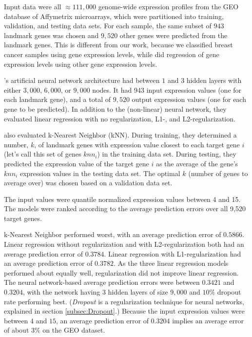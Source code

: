 Input data were all $\approx111,000$ genome-wide expression profiles
from the GEO database of Affymetrix microarrays, which were partitioned
into training, validation, and testing data sets. For each sample,
the same subset of $943$ landmark genes was chosen and $9,520$ other
genes were predicted from the landmark genes. This is different from
our work, because we classified breast cancer samples using gene expression
levels, while \cite{ChenXie2015} did regression of gene expression
levels using other gene expression levels.

\cite{ChenXie2015}'s artificial neural network architecture had between
$1$ and $3$ hidden layers with either $3,000$, $6,000$, or $9,000$
nodes. It had 943 input expression values (one for each landmark gene),
and a total of $9,520$ output expression values (one for each gene
to be predicted). In addition to the (non-linear) neural network,
they evaluated linear regression with no regularization, L1-, and
L2-regularization.

\cite{ChenXie2015} also evaluated k-Nearest Neighbor (kNN).
During training, they determined a number, $k$, of landmark genes
with expression value closest to each target gene $i$ (let's call
this set of genes $knn_{i}$) in the training data set. During testing,
they predicted the expression value of the target gene $i$ as the
average of the gene's $knn_{i}$ expression values in the testing
data set. The optimal $k$ (number of genes to average over) was chosen
based on a validation data set.

The input values were quantile normalized expression values between
4 and 15. The models were ranked according to the average prediction
errors over all 9,520 target genes.

k-Nearest Neighbor performed worst, with an average prediction error
of $0.5866$. Linear regression without regularization and with L2-regularization
both had an average prediction error of $0.3784$. Linear regression
with L1-regularization had an average prediction error of $0.3782$.
As the three linear regression models performed about equally well,
regularization did not improve linear regression. The neural network-based
average prediction errors were between $0.3421$ and $0.3204$, with
the network having $3$ hidden layers of size $9,000$ and $10\%$
dropout rate performing best. (\emph{Dropout }is a regularization
technique for neural networks, explained in section \ref{subsec:Dropout}.)
Because the input expression values were between $4$ and $15$, an
average prediction error of $0.3204$ implies an average error of
about $3\%$ on the GEO dataset.

